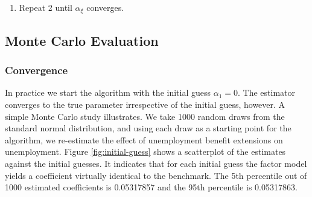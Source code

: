\documentclass[12pt]{article}
\newcommand{\1}{\mathbf{1}}
\begin{document}
\begin{appendix}
\begin{enumerate}
\begin{enumerate}
\item given $\alpha_{\xi}$, for each $p$, construct $\upsilon_{p,t}=\Delta x_{p,t}-\beta\left(1-s_t \right)\Delta x_{p,t+1}-\alpha_{j}\Delta b_{p,t}.$
Then, $\upsilon_{p,t}=\lambda_{p}'F_{t}$ is a pure factor model and can be estimated consistently using principal components.\footnote{The exposition of the estimator assumes that there are no missing observations. We use the generalized procedure described in \citet{bai:09} and allow for missing observations.}
\item Given the estimates for $\lambda_p$ and $F_t$, estimate Eq. (\ref{eq:baseline_spec}) via OLS and update the guess to obtain $\alpha_{\xi+1}$.
\end{enumerate}
\item Repeat 2 until $\alpha_{\xi}$ converges.%
\end{enumerate}


\subsection{Monte Carlo Evaluation}

\subsubsection{Convergence}
In practice we start the algorithm with the initial guess $\alpha_{1}=0$. The estimator converges to the true parameter irrespective of the initial guess, however. A simple Monte Carlo study illustrates. We take 1000 random draws from the standard normal distribution, and using each draw as a starting point for the algorithm, we re-estimate the effect of unemployment benefit extensions on unemployment. Figure \ref{fig:initial-guess} shows a scatterplot of the estimates
against the initial guesses. It indicates that for each initial guess the factor model yields a coefficient virtually identical to the benchmark. The 5th percentile out of 1000 estimated coefficients is 0.05317857 and the 95th percentile is 0.05317863.


\end{appendix}
\end{document}
